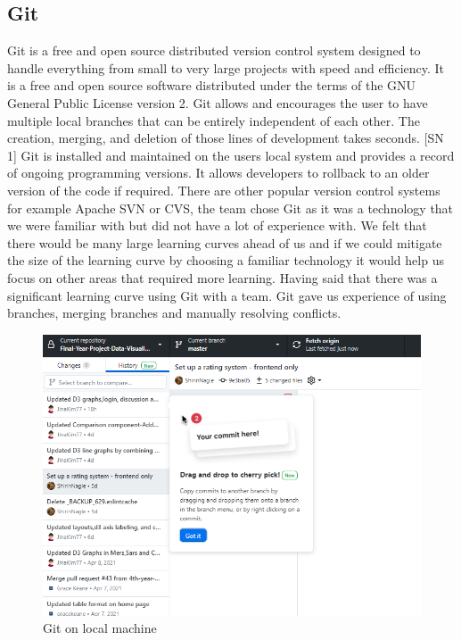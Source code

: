 \subsection{Git}
Git is a free and open source distributed version control system designed to handle everything from small to very large projects with speed and efficiency. It is a free and open source software distributed under the terms of the GNU General Public License version 2.
Git allows and encourages the user to have multiple local branches that can be entirely independent of each other. The creation, merging, and deletion of those lines of development takes seconds. [SN 1] 
Git is installed and maintained on the users local system and provides a record of ongoing programming versions. It allows developers to rollback to an older version of the code if required.
There are other popular version control systems for example Apache SVN or CVS, the team chose Git as it was a technology that we were familiar with but did not have a lot of experience with. We felt that there would be many large learning curves ahead of us and if we could mitigate the size of the learning curve by choosing a familiar technology it would help us focus on other areas that required more learning. Having said that there was a significant learning curve using Git with a team. Git gave us experience of using branches, merging branches and manually resolving conflicts.
\begin{figure}
    \centering
    \includegraphics[scale=0.7]{img/git.PNG}
    \caption{Git on local machine}
    \label{fig:my_label}
\end{figure}    
      


